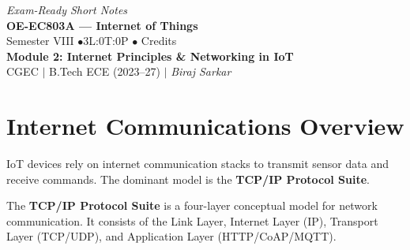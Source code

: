 \documentclass[12pt,a4paper]{article}
\begin{document}
\begin{center}
  \hfill \textit{Exam-Ready Short Notes} \\
  \vspace{6pt}
  {\LARGE\bfseries\color{myred} OE-EC803A --- Internet of Things}\\[5pt]
  {\normalsize\color{mydark} Semester VIII \quad$\bullet$\quad 3L:0T:0P \quad$\bullet$ Credits}\\[3pt]
  {\normalsize\color{myteal}\textbf{Module 2: Internet Principles \& Networking in IoT}}\\[3pt]
  {\small\color{mydark} CGEC \;$|$\; B.Tech ECE (2023--27) \;$|$\; \textit{Biraj Sarkar}}
\end{center}
\vspace{2pt}
\noindent{\color{myred}\rule{\linewidth}{1.5pt}}
\vspace{2pt}

\hypersetup{linkcolor=mydark}
\tableofcontents
\hypersetup{linkcolor=myteal}
\newpage

\section{Internet Communications Overview}

IoT devices rely on internet communication stacks to transmit sensor data and receive commands. The dominant model is the \textbf{TCP/IP Protocol Suite}.

\begin{tcolorbox}[defbox, title={TCP/IP Protocol Suite}]
  The \textbf{TCP/IP Protocol Suite} is a four-layer conceptual model for network communication. It consists of the Link Layer, Internet Layer (IP), Transport Layer (TCP/UDP), and Application Layer (HTTP/CoAP/MQTT).
\end{tcolorbox}
\end{document}
